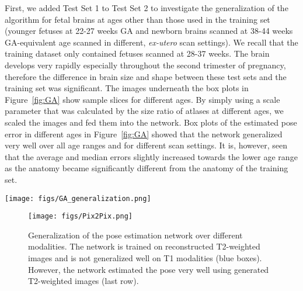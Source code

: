 \documentclass[journal,transmag]{IEEEtran}
\begin{document}
First, we added Test Set 1 to Test Set 2 to investigate the generalization of the algorithm for fetal brains at ages other than those used in the training set (younger fetuses at 22-27 weeks GA and newborn brains scanned at 38-44 weeks GA-equivalent age scanned in different, \textit{ex-utero} scan settings). We recall that the training dataset only contained fetuses scanned at 28-37 weeks. The brain develops very rapidly especially throughout the second trimester of pregnancy, therefore the difference in brain size and shape between these test sets and the training set was significant. The images underneath the box plots in Figure~\ref{fig:GA} show sample slices for different ages. By simply using a scale parameter that was calculated by the size ratio of atlases at different ages, we scaled the images and fed them into the network. Box plots of the estimated pose error in different ages in Figure~\ref{fig:GA} showed that the network generalized very well over all age ranges and for different scan settings. It is, however, seen that the average and median errors slightly increased towards the lower age range as the anatomy became significantly different from the anatomy of the training set.  

\begin{figure*}
    \centering
    \texttt{[image: figs/GA\_generalization.png]}
    \caption{Generalization property of the pose network (3DPose-Net) on different ages and different scan settings (fetal vs. newborn scans). The network was trained using fetal samples scanned between 27-37 weeks (orange dashed line), and tested on fetal samples scanned at 22-26 weeks and newborns scanned \textit{ex-utero} at 38-44 weeks (Test Set 2). The variation in size and shape of the brain is high as the brain develops very rapidly throughout 21-30 weeks GA. This figure shows that while there were large systematic differences between the train and test data, the network generalized well to estimate the pose.}
    \label{fig:GA}
\end{figure*}

\begin{figure}
    \centering
    \texttt{[image: figs/Pix2Pix.png]}
    \caption{Generalization of the pose estimation network over different modalities. The network is trained on reconstructed T2-weighted images and is not generalized well on T1 modalities (blue boxes). However, the network estimated the pose very well using generated T2-weighted images (last row).}
    \label{fig:T1toT2}
\end{figure}
\end{document}
